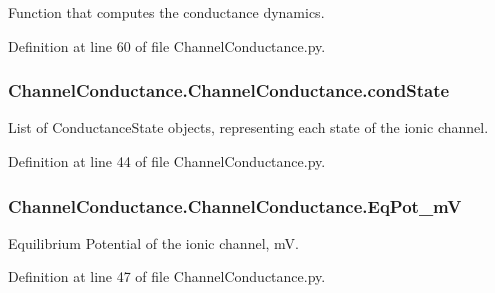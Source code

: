 Function that computes the conductance dynamics. 



Definition at line 60 of file Channel\+Conductance.\+py.

\subsubsection[{\texorpdfstring{cond\+State}{condState}}]{\setlength{\rightskip}{0pt plus 5cm}Channel\+Conductance.\+Channel\+Conductance.\+cond\+State}\hypertarget{class_channel_conductance_1_1_channel_conductance_a628553cbc1efd93b30b0a15afd4417d9}{}\label{class_channel_conductance_1_1_channel_conductance_a628553cbc1efd93b30b0a15afd4417d9}


List of Conductance\+State objects, representing each state of the ionic channel. 



Definition at line 44 of file Channel\+Conductance.\+py.

\subsubsection[{\texorpdfstring{Eq\+Pot\+\_\+mV}{EqPot_mV}}]{\setlength{\rightskip}{0pt plus 5cm}Channel\+Conductance.\+Channel\+Conductance.\+Eq\+Pot\+\_\+mV}\hypertarget{class_channel_conductance_1_1_channel_conductance_a654a73b6cd5853b509e7f7fba060572b}{}\label{class_channel_conductance_1_1_channel_conductance_a654a73b6cd5853b509e7f7fba060572b}


Equilibrium Potential of the ionic channel, mV. 



Definition at line 47 of file Channel\+Conductance.\+py.

